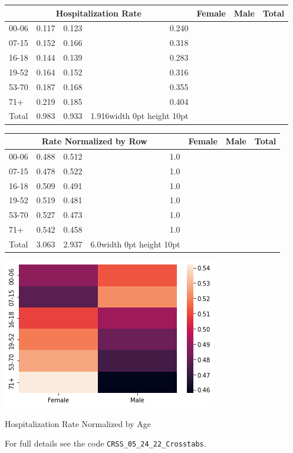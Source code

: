 \begin{center}
\begin{tabular}{lrrr}
\multicolumn{4}{c}{Hospitalization Rate} \cr
\toprule
{Age} &  Female &   Male &  Total \\
\midrule
00-06 &   0.117 &  0.123 &  0.240 \\
07-15 &   0.152 &  0.166 &  0.318 \\
16-18 &   0.144 &  0.139 &  0.283 \\
19-52 &   0.164 &  0.152 &  0.316 \\
53-70 &   0.187 &  0.168 &  0.355 \\
71+   &   0.219 &  0.185 &  0.404 \\ \hline
Total &   0.983 &  0.933 &  1.916\vrule width 0pt height 10pt \\
\bottomrule
\end{tabular}
\end{center}

\begin{center}
\begin{tabular}{lrrr}
\multicolumn{4}{c}{Rate Normalized by Row} \cr
\toprule
{Age} &  Female &   Male &  Total \\
\midrule
00-06 &   0.488 &  0.512 &    1.0 \\
07-15 &   0.478 &  0.522 &    1.0 \\
16-18 &   0.509 &  0.491 &    1.0 \\
19-52 &   0.519 &  0.481 &    1.0 \\
53-70 &   0.527 &  0.473 &    1.0 \\
71+   &   0.542 &  0.458 &    1.0 \\ \hline
Total &   3.063 &  2.937 &    6.0\vrule width 0pt height 10pt \\
\bottomrule
\end{tabular}
\end{center}

\begin{center}
\includegraphics[scale=0.6]{AGE_IM_SEX_IM_Row.png}

Hospitalization Rate Normalized by Age
\end{center}

For full details see the code \verb|CRSS_05_24_22_Crosstabs|.
